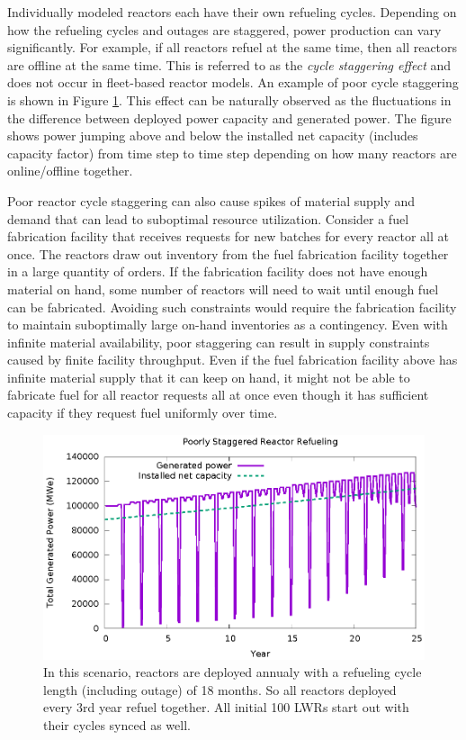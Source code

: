 \documentclass{style}
\begin{document}
Individually modeled reactors each have their own refueling cycles.  Depending
on how the refueling cycles and outages are staggered, power production can
vary significantly.  For example, if all reactors refuel at the same time,
then all reactors are offline at the same time.  This is referred to as the
\emph{cycle staggering effect} and does not occur in fleet-based reactor
models.  An example of poor cycle staggering is shown in Figure
\ref{fig:sync-cycle}.  This effect can be naturally observed as the
fluctuations in the difference between deployed power capacity and generated
power.  The figure shows power jumping above and below the installed net
capacity (includes capacity factor) from time step to time step depending on
how many reactors are online/offline together.

Poor reactor cycle staggering can also cause spikes of material supply and
demand that can lead to suboptimal resource utilization.  Consider a fuel
fabrication facility that receives requests for new batches for every reactor
all at once.  The reactors draw out inventory from the fuel fabrication
facility together in a large quantity of orders.  If the fabrication facility
does not have enough material on hand, some number of reactors will need to
wait until enough fuel can be fabricated.  Avoiding such
constraints would require the fabrication facility to maintain suboptimally
large on-hand inventories as a contingency.  Even with infinite material
availability, poor staggering can result in supply constraints caused by
finite facility throughput. Even if the fuel fabrication facility above has
infinite material supply that it can keep on hand, it might not be able to
fabricate fuel for all reactor requests all at once even though it has
sufficient capacity if they request fuel uniformly over time.

\begin{figure}[h]
    \centering
    \includegraphics[width=1.0\columnwidth]{exp2/sync-cycle.eps}
    \caption[The cycle staggering effect]{
        In this scenario, reactors are deployed annualy with a refueling cycle
        length (including outage) of 18 months.  So all reactors deployed
        every 3rd year refuel together.  All initial 100 LWRs start out with
        their cycles synced as well.
    }
    \label{fig:sync-cycle}
\end{figure}
\end{document}
